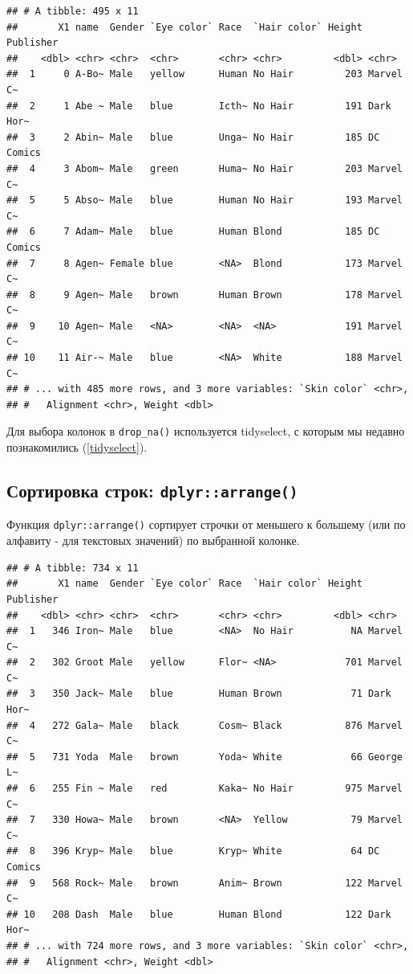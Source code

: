 \documentclass[]{book}
\newenvironment{Shaded}{\begin{snugshade}}{\end{snugshade}}
\newcommand{\KeywordTok}[1]{\textcolor[rgb]{0.13,0.29,0.53}{\textbf{#1}}}
\newcommand{\StringTok}[1]{\textcolor[rgb]{0.31,0.60,0.02}{#1}}
\newcommand{\OperatorTok}[1]{\textcolor[rgb]{0.81,0.36,0.00}{\textbf{#1}}}
\newcommand{\NormalTok}[1]{#1}
\begin{document}
\begin{verbatim}
## # A tibble: 495 x 11
##       X1 name  Gender `Eye color` Race  `Hair color` Height Publisher
##    <dbl> <chr> <chr>  <chr>       <chr> <chr>         <dbl> <chr>    
##  1     0 A-Bo~ Male   yellow      Human No Hair         203 Marvel C~
##  2     1 Abe ~ Male   blue        Icth~ No Hair         191 Dark Hor~
##  3     2 Abin~ Male   blue        Unga~ No Hair         185 DC Comics
##  4     3 Abom~ Male   green       Huma~ No Hair         203 Marvel C~
##  5     5 Abso~ Male   blue        Human No Hair         193 Marvel C~
##  6     7 Adam~ Male   blue        Human Blond           185 DC Comics
##  7     8 Agen~ Female blue        <NA>  Blond           173 Marvel C~
##  8     9 Agen~ Male   brown       Human Brown           178 Marvel C~
##  9    10 Agen~ Male   <NA>        <NA>  <NA>            191 Marvel C~
## 10    11 Air-~ Male   blue        <NA>  White           188 Marvel C~
## # ... with 485 more rows, and 3 more variables: `Skin color` <chr>,
## #   Alignment <chr>, Weight <dbl>
\end{verbatim}

Для выбора колонок в \texttt{drop\_na()} используется tidyselect, с
которым мы недавно познакомились (\ref{tidyselect}).

\subsection{\texorpdfstring{Сортировка строк:
\texttt{dplyr::arrange()}}{Сортировка строк: dplyr::arrange()}}\label{tidy_arrange}

Функция \texttt{dplyr::arrange()} сортирует строчки от меньшего к
большему (или по алфавиту - для текстовых значений) по выбранной
колонке.

\begin{Shaded}
\end{Shaded}

\begin{verbatim}
## # A tibble: 734 x 11
##       X1 name  Gender `Eye color` Race  `Hair color` Height Publisher
##    <dbl> <chr> <chr>  <chr>       <chr> <chr>         <dbl> <chr>    
##  1   346 Iron~ Male   blue        <NA>  No Hair          NA Marvel C~
##  2   302 Groot Male   yellow      Flor~ <NA>            701 Marvel C~
##  3   350 Jack~ Male   blue        Human Brown            71 Dark Hor~
##  4   272 Gala~ Male   black       Cosm~ Black           876 Marvel C~
##  5   731 Yoda  Male   brown       Yoda~ White            66 George L~
##  6   255 Fin ~ Male   red         Kaka~ No Hair         975 Marvel C~
##  7   330 Howa~ Male   brown       <NA>  Yellow           79 Marvel C~
##  8   396 Kryp~ Male   blue        Kryp~ White            64 DC Comics
##  9   568 Rock~ Male   brown       Anim~ Brown           122 Marvel C~
## 10   208 Dash  Male   blue        Human Blond           122 Dark Hor~
## # ... with 724 more rows, and 3 more variables: `Skin color` <chr>,
## #   Alignment <chr>, Weight <dbl>
\end{verbatim}
\end{document}
